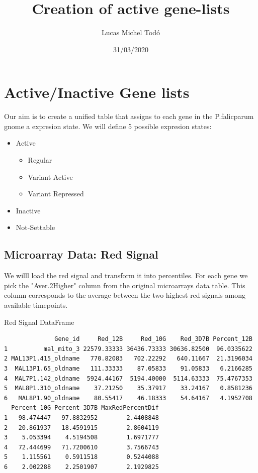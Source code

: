 \documentclass[11pt]{article}
\author{Lucas Michel Todó}
\date{31/03/2020}
\title{Creation of active gene-lists}
\begin{document}
\maketitle
\tableofcontents


\section{Active/Inactive Gene lists}
\label{sec:orgb7f7728}
Our aim is to create a unified table that assigns to each gene in the P.falicparum gnome a expresion state.
We will define 5 possible expresion states:
\begin{itemize}
\item Active
\begin{itemize}
\item Regular
\item Variant Active
\item Variant Repressed
\end{itemize}
\item Inactive
\item Not-Settable
\end{itemize}

\subsection{Microarray Data: Red Signal}
\label{sec:org971d93b}
We willl load the red signal and transform it into percentiles. For each gene we pick the "Aver.2Higher" column from the original microarrays data table. This column corresponds to the average between the two highest red signals among available timepoints.

Red Signal DataFrame
\begin{verbatim}
              Gene_id     Red_12B     Red_10G    Red_3D7B Percent_12B
1          mal_mito_3 22579.33333 36436.73333 30636.82500  96.0335622
2 MAL13P1.415_oldname   770.82083   702.22292   640.11667  21.3196034
3  MAL13P1.65_oldname   111.33333    87.05833    91.05833   6.2166285
4  MAL7P1.142_oldname  5924.44167  5194.40000  5114.63333  75.4767353
5  MAL8P1.310_oldname    37.21250    35.37917    33.24167   0.8581236
6   MAL8P1.90_oldname    80.55417    46.18333    54.64167   4.1952708
  Percent_10G Percent_3D7B MaxRedPercentDif
1   98.474447   97.8832952        2.4408848
2   20.861937   18.4591915        2.8604119
3    5.053394    4.5194508        1.6971777
4   72.444699   71.7200610        3.7566743
5    1.115561    0.5911518        0.5244088
6    2.002288    2.2501907        2.1929825
\end{verbatim}
\end{document}
